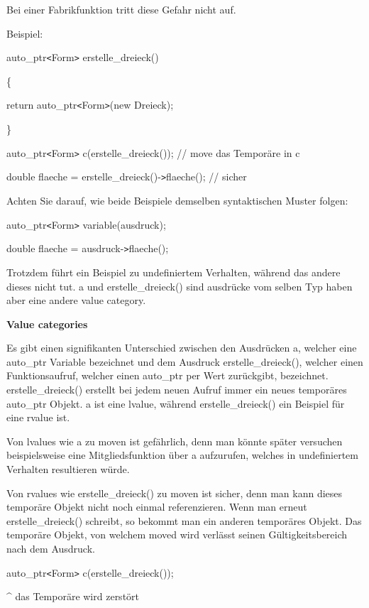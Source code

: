 \documentclass{article}
\begin{document}
Bei einer Fabrikfunktion tritt diese Gefahr nicht auf.

Beispiel:

auto\_ptr\texttt{<}Form\texttt{>} erstelle\_dreieck()

\{    

\parindent=14pt
return auto\_ptr\texttt{<}Form\texttt{>}(new Dreieck);

\parindent=0pt
\}

auto\_ptr\texttt{<}Form\texttt{>} c(erstelle\_dreieck()); // move das Temporäre 
in c

double flaeche = erstelle\_dreieck()-\texttt{>}flaeche(); // sicher

Achten Sie darauf, wie beide Beispiele demselben syntaktischen Muster folgen:

auto\_ptr\texttt{<}Form\texttt{>} variable(ausdruck);

double flaeche = ausdruck-\texttt{>}flaeche();

Trotzdem führt ein Beispiel zu undefiniertem Verhalten, während das andere dieses 
nicht tut. a und erstelle\_dreieck() sind ausdrücke vom selben Typ haben aber 
eine andere value category.

\vspace{12pt}
\textbf{Value categories}

Es gibt einen signifikanten Unterschied zwischen den Ausdrücken a, welcher eine 
auto\_ptr Variable bezeichnet und dem Ausdruck erstelle\_dreieck(), welcher einen 
Funktionsaufruf, welcher einen auto\_ptr per Wert zurückgibt, bezeichnet. erstelle\_dreieck() 
erstellt bei jedem neuen Aufruf immer ein neues temporäres auto\_ptr Objekt. a 
ist eine lvalue, während erstelle\_dreieck() ein Beispiel für eine rvalue ist.

Von lvalues wie a zu moven ist gefährlich, denn man könnte später versuchen 
beispielsweise eine Mitgliedsfunktion über a aufzurufen, welches in undefiniertem 
Verhalten resultieren würde.

Von rvalues wie erstelle\_dreieck() zu moven ist sicher, denn man kann dieses temporäre 
Objekt nicht noch einmal referenzieren. Wenn man erneut erstelle\_dreieck() schreibt, 
so bekommt man ein anderen temporäres Objekt. Das temporäre Objekt, von welchem 
moved wird verlässt seinen Gültigkeitsbereich nach dem Ausdruck.

auto\_ptr\texttt{<}Form\texttt{>} c(erstelle\_dreieck());       

\parindent=115pt
\textasciicircum{} das Temporäre wird zerstört
\end{document}
